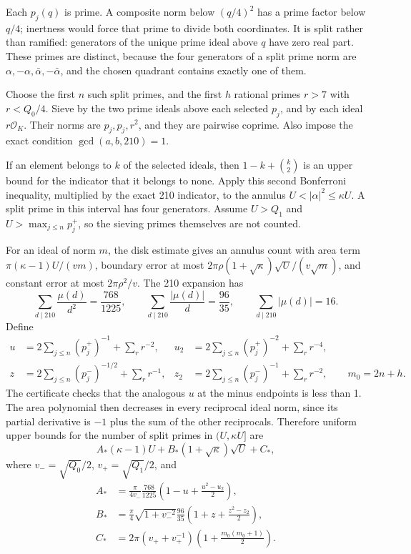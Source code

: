 \documentclass[11pt]{article}
\newcommand{\OK}{\mathcal O_K}
\begin{document}
Each \(p_j(q)\) is prime. A composite norm below \((q/4)^2\) has a
prime factor below \(q/4\); inertness would force that prime to divide
both coordinates. It is split rather than ramified: generators of the
unique prime ideal above \(q\) have zero real part. These primes are
distinct, because the four generators of a split prime norm are
\(\alpha,-\alpha,\bar\alpha,-\bar\alpha\), and the chosen quadrant
contains exactly one of them.

Choose the first \(n\) such split primes, and the first \(h\) rational
primes \(r>7\) with \(r<Q_0/4\). Sieve by the two prime ideals above
each selected \(p_j\), and by each ideal \(r\OK\). Their norms are
\(p_j,p_j,r^2\), and they are pairwise coprime. Also impose the exact
condition \(\gcd(a,b,210)=1\).

If an element belongs to \(k\) of the selected ideals, then
\(1-k+\binom{k}{2}\) is an upper bound for the indicator that it
belongs to none. Apply this second Bonferroni inequality, multiplied
by the exact 210 indicator, to the annulus
\(U<|\alpha|^2\le\kappa U\). A split prime in this interval has four
generators. Assume \(U>Q_1\) and \(U>\max_{j\le n}p_j^+\), so the
sieving primes themselves are not counted.

For an ideal of norm \(m\), the disk estimate gives an annulus count
with area term \(\pi(\kappa-1)U/(vm)\), boundary error at most
\(2\pi\rho(1+\sqrt\kappa)\sqrt U/(v\sqrt m)\), and constant error
at most \(2\pi\rho^2/v\). The 210 expansion has
\[
 \sum_{d\mid210}\frac{\mu(d)}{d^2}=\frac{768}{1225},\qquad
 \sum_{d\mid210}\frac{|\mu(d)|}{d}=\frac{96}{35},\qquad
 \sum_{d\mid210}|\mu(d)|=16.
\]
Define
\begin{align*}
 u&=2\sum_{j\le n}(p_j^+)^{-1}+\sum_{r}r^{-2},&
 u_2&=2\sum_{j\le n}(p_j^+)^{-2}+\sum_r r^{-4},\\
 z&=2\sum_{j\le n}(p_j^-)^{-1/2}+\sum_r r^{-1},&
 z_2&=2\sum_{j\le n}(p_j^-)^{-1}+\sum_r r^{-2},
 \qquad m_0=2n+h.
\end{align*}
The certificate checks that the analogous \(u\) at the minus endpoints
is less than 1. The area polynomial then decreases in every reciprocal
ideal norm, since its partial derivative is \(-1\) plus the sum of
the other reciprocals. Therefore uniform upper bounds for the number
of split primes in \((U,\kappa U]\) are
\begin{equation}\label{split-annulus}
 A_*(\kappa-1)U+B_*(1+\sqrt\kappa)\sqrt U+C_*,
\end{equation}
where \(v_-=\sqrt{Q_0}/2\), \(v_+=\sqrt{Q_1}/2\), and
\begin{align*}
 A_*&=\frac{\pi}{4v_-}\frac{768}{1225}
          \left(1-u+\frac{u^2-u_2}{2}\right),\\
 B_*&=\frac\pi4\sqrt{1+v_-^{-2}}\frac{96}{35}
          \left(1+z+\frac{z^2-z_2}{2}\right),\\
 C_*&=2\pi(v_++v_+^{-1})
          \left(1+\frac{m_0(m_0+1)}2\right).
\end{align*}
\end{document}
